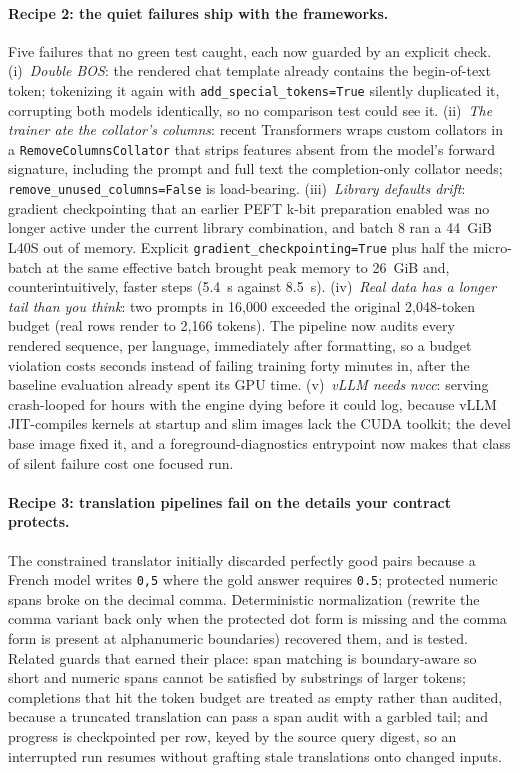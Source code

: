 \documentclass{article}
\begin{document}
\paragraph{Recipe 2: the quiet failures ship with the frameworks.}
Five failures that no green test caught, each now guarded by an explicit check. (i)~\emph{Double BOS}: the rendered chat template already contains the begin-of-text token; tokenizing it again with \texttt{add\_special\_tokens=True} silently duplicated it, corrupting both models identically, so no comparison test could see it. (ii)~\emph{The trainer ate the collator's columns}: recent Transformers wraps custom collators in a \texttt{RemoveColumnsCollator} that strips features absent from the model's forward signature, including the prompt and full text the completion-only collator needs; \texttt{remove\_unused\_columns=False} is load-bearing. (iii)~\emph{Library defaults drift}: gradient checkpointing that an earlier PEFT k-bit preparation enabled was no longer active under the current library combination, and batch 8 ran a 44~GiB L40S out of memory. Explicit \texttt{gradient\_checkpointing=True} plus half the micro-batch at the same effective batch brought peak memory to 26~GiB and, counterintuitively, faster steps (5.4~s against 8.5~s). (iv)~\emph{Real data has a longer tail than you think}: two prompts in 16{,}000 exceeded the original 2{,}048-token budget (real rows render to 2{,}166 tokens). The pipeline now audits every rendered sequence, per language, immediately after formatting, so a budget violation costs seconds instead of failing training forty minutes in, after the baseline evaluation already spent its GPU time. (v)~\emph{vLLM needs nvcc}: serving crash-looped for hours with the engine dying before it could log, because vLLM JIT-compiles kernels at startup and slim images lack the CUDA toolkit; the devel base image fixed it, and a foreground-diagnostics entrypoint now makes that class of silent failure cost one focused run.

\paragraph{Recipe 3: translation pipelines fail on the details your contract protects.}
The constrained translator initially discarded perfectly good pairs because a French model writes \texttt{0,5} where the gold answer requires \texttt{0.5}; protected numeric spans broke on the decimal comma. Deterministic normalization (rewrite the comma variant back only when the protected dot form is missing and the comma form is present at alphanumeric boundaries) recovered them, and is tested. Related guards that earned their place: span matching is boundary-aware so short and numeric spans cannot be satisfied by substrings of larger tokens; completions that hit the token budget are treated as empty rather than audited, because a truncated translation can pass a span audit with a garbled tail; and progress is checkpointed per row, keyed by the source query digest, so an interrupted run resumes without grafting stale translations onto changed inputs.
\end{document}
